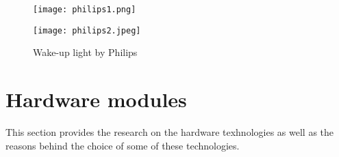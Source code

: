 \begin{figure}[h!]
\centering
\begin{minipage}[b]{0.45\textwidth}
\texttt{[image: philips1.png]}
\label{fig:philips1}
\end{minipage}
\begin{minipage}[b]{0.45\textwidth}
\texttt{[image: philips2.jpeg]}
\label{fig:philips2}
\end{minipage}
\caption{Wake-up light by Philips}
\label{philips}
\end{figure}



\section{Hardware modules}
This section provides the research on the hardware texhnologies as well as the reasons behind the choice of some of these technologies. 

